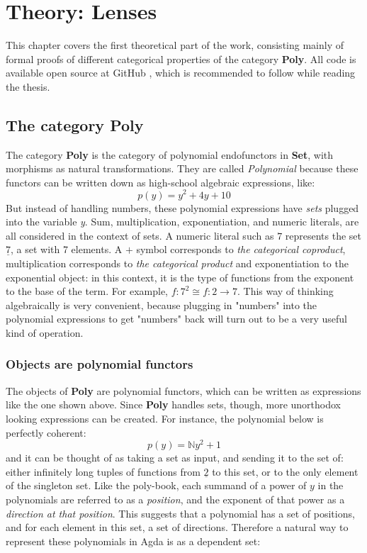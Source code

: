 
\chapter{Theory: Lenses}\label{chapter:lenses}
This chapter covers the first theoretical part of the work, consisting mainly of formal proofs of different categorical properties of the category \textbf{Poly}. All code is available open source at GitHub \cite{githubRepo}, which is recommended to follow while reading the thesis.

\section{The category \textbf{Poly}}

The category \textbf{Poly} is the category of polynomial endofunctors in \textbf{Set}, with morphisms as natural transformations. They are called \textit{Polynomial} because these functors can be written down as high-school algebraic expressions, like:
$$p(y) = y^2 +4y + 10$$
But instead of handling numbers, these polynomial expressions have \textit{sets} plugged into the variable \textit{y}.
Sum, multiplication, exponentiation, and numeric literals, are all considered in the context of sets. A numeric literal such as $7$ represents the set $\underline{7}$, a set with 7 elements. A $+$ symbol corresponds to \textit{the categorical coproduct}, multiplication  corresponds to \textit{the categorical product} and exponentiation to the exponential object: in this context, it is the type of functions from the exponent to the base of the term. For example, $ f : 7^2 \cong f : 2 \rightarrow 7$. This way of thinking algebraically is very convenient, because plugging in "numbers" into the polynomial expressions to get "numbers" back will turn out to be a very useful kind of operation.

\subsection{Objects are polynomial functors}

The objects of \textbf{Poly} are polynomial functors, which can be written as expressions like the one shown above. Since \textbf{Poly} handles sets, though, more unorthodox looking expressions can be created. For instance, the polynomial below is perfectly coherent:
\begin{equation}
p(y) = \mathbb{N}y^2 + 1
\label{eqn.natpoly}
\end{equation}
and it can be thought of as taking a set as input, and sending it to the set of: either infinitely long tuples of functions from $\underline{2}$ to this set, or to the only element of the singleton set. Like the poly-book, each summand of a power of $y$ in the polynomials are referred to as a \textit{position}, and the exponent of that power as a \textit{direction at that position}. This suggests that a polynomial has a set of positions, and for each element in this set, a set of directions. Therefore a natural way to represent these polynomials in Agda is as a dependent set:

